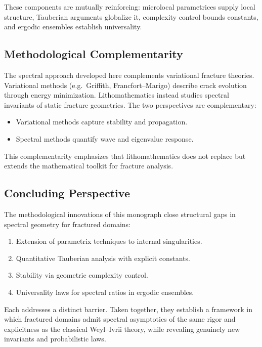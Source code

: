 These components are mutually reinforcing: microlocal parametrices supply local
structure, Tauberian arguments globalize it, complexity control bounds constants,
and ergodic ensembles establish universality.

\subsection{Methodological Complementarity}

The spectral approach developed here complements variational fracture
theories. Variational methods (e.g.\ Griffith, Francfort--Marigo) describe
crack evolution through energy minimization. Lithomathematics instead studies
spectral invariants of static fracture geometries. The two perspectives are
complementary:

\begin{itemize}
  \item Variational methods capture stability and propagation.
  \item Spectral methods quantify wave and eigenvalue response.
\end{itemize}

This complementarity emphasizes that lithomathematics does not replace but
extends the mathematical toolkit for fracture analysis.

\subsection{Concluding Perspective}

The methodological innovations of this monograph close structural gaps in
spectral geometry for fractured domains:

\begin{enumerate}
  \item Extension of parametrix techniques to internal singularities.
  \item Quantitative Tauberian analysis with explicit constants.
  \item Stability via geometric complexity control.
  \item Universality laws for spectral ratios in ergodic ensembles.
\end{enumerate}

Each addresses a distinct barrier. Taken together, they establish a framework
in which fractured domains admit spectral asymptotics of the same rigor and
explicitness as the classical Weyl--Ivrii theory, while revealing genuinely new
invariants and probabilistic laws.

